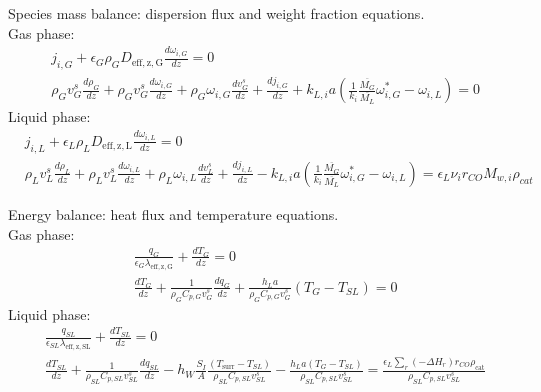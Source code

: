 \documentclass{article}
\begin{document}
Species mass balance: dispersion flux and weight fraction equations.\\
Gas phase:
\begin{equation}
	\begin{split}
	& j_{i,G} + \epsilon_G \rho_G D_{\mathrm{eff,z,G}} \frac{d\omega_{i,G}}{dz} = 0\\
	& \rho_Gv_G^s \frac{d\rho_G}{dz} + \rho_Gv_G^s\frac{d\omega_{i,G}}{dz} + \rho_G\omega_{i,G}\frac{dv_G^s}{dz} + \frac{dj_{i,G}}{dz} + k_{L,i}a(\frac{1}{k_i}\frac{\overline{M_G}}{\overline{M_L}}\omega_{i,G}^*-\omega_{i,L}) = 0
	\end{split}
\end{equation}
Liquid phase:
\begin{equation}
	\begin{split}
	& j_{i,L} + \epsilon_L \rho_L D_{\mathrm{eff,z,L}} \frac{d\omega_{i,L}}{dz} = 0\\
	&\rho_Lv_L^s \frac{d\rho_L}{dz} + \rho_Lv_L^s\frac{d\omega_{i,L}}{dz} + \rho_L\omega_{i,L}\frac{dv_L^s}{dz} + \frac{dj_{i,L}}{dz} - k_{L,i}a(\frac{1}{k_i}\frac{\overline{M_G}}{\overline{M_L}}\omega_{i,G}^*-\omega_{i,L})= \epsilon_L \nu_i r_{CO} M_{w,i}\rho_{cat}
	\end{split}
\end{equation}

Energy balance: heat flux and temperature equations.\\
Gas phase:
\begin{equation}
\begin{split}
& \frac{q_G}{\epsilon_G\lambda_{\mathrm{eff,z,G}}} + \frac{dT_G}{dz} = 0\\
& \frac{dT_G}{dz} + \frac{1}{\rho_G C_{p,G} v_G^s}\frac{dq_G}{dz} + \frac{h_L a}{\rho_G C_{p,G} v_G^s}(T_G - T_{SL}) = 0
\end{split}
\end{equation}
Liquid phase:
\begin{equation}
\begin{split}
& \frac{q_{SL}}{\epsilon_{SL}\lambda_{\mathrm{eff,z,SL}}} + \frac{dT_{SL}}{dz} = 0 \\
& \frac{d T_{SL}}{dz} + \frac{1}{\rho_{SL}C_{p,SL}v_{SL}^s}\frac{dq_{SL}}{dz} - h_W\frac{S_I}{A}\frac{(T_{\mathrm{surr}}-T_{SL})}{\rho_{SL}C_{p,SL}v_{SL}^s} - \frac{h_L a(T_G - T_{SL})}{\rho_{SL}C_{p,SL}v_{SL}^s} = \frac{\epsilon_{L}\sum_r (-\Delta H_r)r_{CO}\rho_{\mathrm{cat}}}{\rho_{SL}C_{p,SL}v_{SL}^s}
\end{split}
\end{equation}


 
\end{document}
